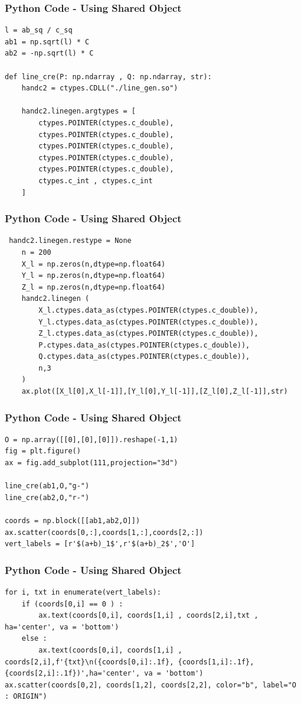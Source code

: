 \documentclass{beamer}
\begin{document}
\begin{frame}[fragile]
    \frametitle{Python Code - Using Shared Object}
    \begin{lstlisting}
l = ab_sq / c_sq
ab1 = np.sqrt(l) * C
ab2 = -np.sqrt(l) * C

def line_cre(P: np.ndarray , Q: np.ndarray, str):
    handc2 = ctypes.CDLL("./line_gen.so")

    handc2.linegen.argtypes = [
        ctypes.POINTER(ctypes.c_double),
        ctypes.POINTER(ctypes.c_double),
        ctypes.POINTER(ctypes.c_double),
        ctypes.POINTER(ctypes.c_double),
        ctypes.POINTER(ctypes.c_double),
        ctypes.c_int , ctypes.c_int
    ]
\end{lstlisting}
\end{frame}

\begin{frame}[fragile]
    \frametitle{Python Code - Using Shared Object}
    \begin{lstlisting}
 handc2.linegen.restype = None
    n = 200
    X_l = np.zeros(n,dtype=np.float64)
    Y_l = np.zeros(n,dtype=np.float64)
    Z_l = np.zeros(n,dtype=np.float64)
    handc2.linegen (
        X_l.ctypes.data_as(ctypes.POINTER(ctypes.c_double)),
        Y_l.ctypes.data_as(ctypes.POINTER(ctypes.c_double)),
        Z_l.ctypes.data_as(ctypes.POINTER(ctypes.c_double)),
        P.ctypes.data_as(ctypes.POINTER(ctypes.c_double)),
        Q.ctypes.data_as(ctypes.POINTER(ctypes.c_double)),
        n,3
    )
    ax.plot([X_l[0],X_l[-1]],[Y_l[0],Y_l[-1]],[Z_l[0],Z_l[-1]],str)
\end{lstlisting}
\end{frame}
\begin{frame}[fragile]
    \frametitle{Python Code - Using Shared Object}
    \begin{lstlisting}
O = np.array([[0],[0],[0]]).reshape(-1,1)
fig = plt.figure()
ax = fig.add_subplot(111,projection="3d")

line_cre(ab1,O,"g-")
line_cre(ab2,O,"r-")

coords = np.block([[ab1,ab2,O]])
ax.scatter(coords[0,:],coords[1,:],coords[2,:])
vert_labels = [r'$(a+b)_1$',r'$(a+b)_2$','O']
    \end{lstlisting}
\end{frame}

\begin{frame}[fragile]
    \frametitle{Python Code - Using Shared Object}
    \begin{lstlisting}
for i, txt in enumerate(vert_labels):
    if (coords[0,i] == 0 ) :
        ax.text(coords[0,i], coords[1,i] , coords[2,i],txt , ha='center', va = 'bottom')
    else :
        ax.text(coords[0,i], coords[1,i] , coords[2,i],f'{txt}\n({coords[0,i]:.1f}, {coords[1,i]:.1f}, {coords[2,i]:.1f})',ha='center', va = 'bottom')
ax.scatter(coords[0,2], coords[1,2], coords[2,2], color="b", label="O : ORIGIN")
\end{lstlisting}
\end{frame}
\end{document}
